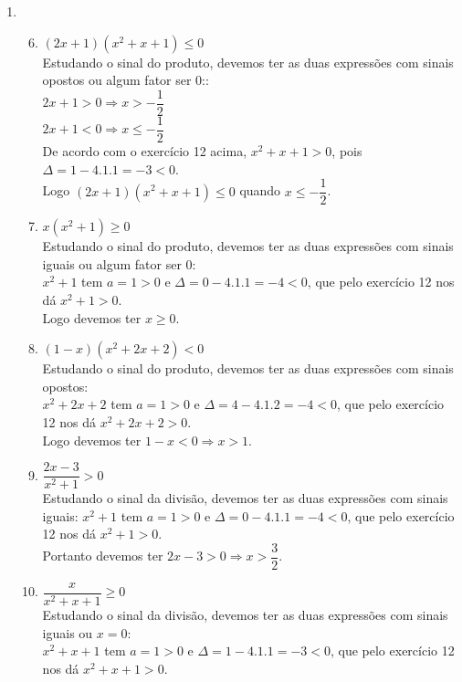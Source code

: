 \documentclass[10pt]{book}
\begin{document}
\begin{enumerate}
\begin{enumerate}
		\end{enumerate}
	\item %
	\begin{enumerate}
		\setcounter{enumii}{5}
		\item %
		$(2x + 1)(x^2+x+1) \leq 0$\\
			Estudando o sinal do produto, devemos ter as duas expressões com sinais opostos ou algum fator ser 0::\\
			$2x + 1 > 0 \Rightarrow x > -\dfrac{1}{2}$\\
			$2x + 1 < 0 \Rightarrow x \leq -\dfrac{1}{2}$\\
			De acordo com o exercício 12 acima, $x^2+x+1 >0$, pois $\Delta = 1 - 4.1.1 = -3 < 0$.\\ 
			Logo $(2x + 1)(x^2+x+1) \leq 0$ quando $x \leq -\dfrac{1}{2}$.
		\item %
		$x(x^2+1)\geq 0$\\
		Estudando o sinal do produto, devemos ter as duas expressões com sinais iguais ou algum fator ser 0:\\
		$x^2+1$ tem $a = 1 > 0$ e $\Delta = 0 - 4.1.1=-4<0$, que pelo exercício 12 nos dá $x^2+1 > 0$.\\
		Logo devemos ter $x \geq 0$.
		\item %
		$(1-x)(x^2+2x+2)<0$\\
		Estudando o sinal do produto, devemos ter as duas expressões com sinais opostos:\\
		$x^2+2x+2$ tem $a=1 >0$ e $\Delta = 4-4.1.2=-4 <0$, que pelo exercício 12 nos dá $x^2+2x+2 > 0$.\\
		Logo devemos ter $1-x < 0 \Rightarrow x > 1$.
		\item %
		$\dfrac{2x-3}{x^2+1}>0$\\		
		Estudando o sinal da divisão, devemos ter as duas expressões com sinais iguais:
		$x^2+1$ tem $a = 1 > 0$ e $\Delta = 0 - 4.1.1 = -4 < 0$, que pelo exercício 12 nos dá $x^2+1 > 0$.\\
		Portanto devemos ter $2x - 3 > 0 \Rightarrow x > \dfrac{3}{2}$.
		\item %
		$\dfrac{x}{x^2+x+1}\geq 0$\\
		Estudando o sinal da divisão, devemos ter as duas expressões com sinais iguais ou $x = 0$:\\
		$x^2+x+1$ tem $a=1 > 0$ e $\Delta = 1-4.1.1 = -3 < 0$, que pelo exercício 12 nos dá $x^2+x+1 > 0$.\\

\end{enumerate}
\end{enumerate}
\end{document}
